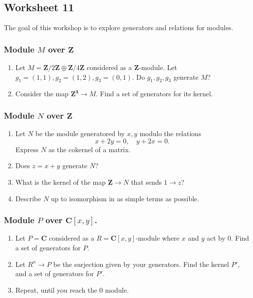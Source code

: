 \documentclass[11pt]{article}
\begin{document}
\subsection{Worksheet 11}
\label{sec:org8869ecf}
The goal of this workshop is to explore generators and relations for modules.
\subsubsection{Module \(M\) over \(\mathbf{Z}\)}
\label{sec:org9145a2a}
\begin{enumerate}
\item Let \(M = \mathbf{Z}/2 \mathbf{Z} \oplus \mathbf{Z}/4 \mathbf{Z}\) considered as a \(\mathbf{Z}\)-module.
Let \(g_1 = (1,1), g_2 = (1,2), g_3=(0,1)\).
Do \(g_{1}, g_2, g_3\) generate \(M\)?
\item Consider the map \(\mathbf{Z^3} \to M\).
Find a set of generators for its kernel.
\end{enumerate}

\subsubsection{Module \(N\) over \(\mathbf{Z}\)}
\label{sec:orgdeb83c5}
\begin{enumerate}
\item Let \(N\) be the module generatored by \(x, y\) modulo the relations
\[ x + 2y = 0, \quad y + 2x = 0.\]
Express \(N\) as the cokernel of a matrix.
\item Does \(z = x+y\) generate \(N\)?
\item What is the kernel of the map \(\mathbf{Z} \to N\) that sends \(1 \to z\)?
\item Describe \(N\) up to isomorphism in as simple terms as possible.
\end{enumerate}

\subsubsection{Module \(P\) over \(\mathbf{C}[x,y]\).}
\label{sec:org97999de}
\begin{enumerate}
\item Let \(P = \mathbf{C}\) considered as a \(R = \mathbf{C}[x,y]\)-module where \(x\) and \(y\) act by \(0\).
Find a set of generators for \(P\).
\item Let \(R^n \to P\) be the surjection given by your generators.
Find the kernel \(P'\), and a set of generators for \(P'\).
\item Repeat, until you reach the 0 module.
\end{enumerate}
\end{document}
